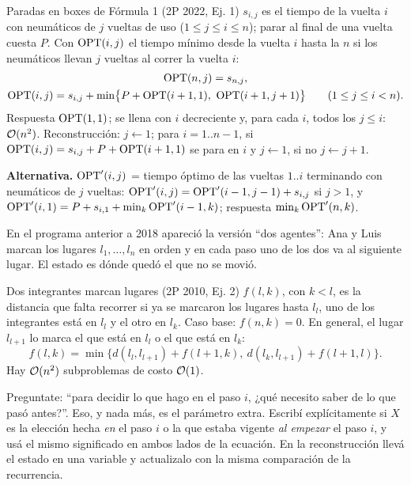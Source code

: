 \begin{problema}{Paradas en boxes de Fórmula 1 (2P 2022, Ej. 1)}
$s_{i,j}$ es el tiempo de la vuelta $i$ con neumáticos de $j$ vueltas de uso
($1\le j\le i\le n$); parar al final de una vuelta cuesta $P$. Con
$\mathrm{OPT}(i,j)$ el tiempo mínimo desde la vuelta $i$ hasta la $n$ si los
neumáticos llevan $j$ vueltas al correr la vuelta $i$:
\begin{gather*}
\OPT(n,j)=s_{n,j},\\
\OPT(i,j)=s_{i,j}+\min\bigl\{P+\OPT(i+1,1),\ \OPT(i+1,j+1)\bigr\}\qquad(1\le j\le i<n).
\end{gather*}
Respuesta $\mathrm{OPT}(1,1)$; se llena con $i$ decreciente y, para cada $i$, todos
los $j\le i$: $\mathcal{O}(n^2)$. Reconstrucción: $j\gets1$; para $i=1..n-1$, si
$\mathrm{OPT}(i,j)=s_{i,j}+P+\mathrm{OPT}(i+1,1)$ se para en $i$ y $j\gets1$, si no
$j\gets j+1$.

\textbf{Alternativa.} $\mathrm{OPT}'(i,j)$ = tiempo óptimo de las vueltas $1..i$
terminando con neumáticos de $j$ vueltas: $\mathrm{OPT}'(i,j)=\mathrm{OPT}'(i-1,j-1)+s_{i,j}$
si $j>1$, y $\mathrm{OPT}'(i,1)=P+s_{i,1}+\min_k\mathrm{OPT}'(i-1,k)$; respuesta
$\min_k\mathrm{OPT}'(n,k)$.
\end{problema}

En el programa anterior a 2018 apareció la versión ``dos agentes'': Ana y
Luis marcan los lugares $l_1,\dots,l_n$ en orden y en cada paso uno de los
dos va al siguiente lugar. El estado es dónde quedó el que no se movió.

\begin{problema}{Dos integrantes marcan lugares (2P 2010, Ej. 2)}
$f(l,k)$, con $k<l$, es la distancia que falta recorrer si ya se marcaron
los lugares hasta $l_l$, uno de los integrantes está en $l_l$ y el otro en
$l_k$. Caso base: $f(n,k)=0$. En general, el lugar $l_{l+1}$ lo marca el que
está en $l_l$ o el que está en $l_k$:
\[
f(l,k)=\min\bigl\{d(l_l,l_{l+1})+f(l+1,k),\ d(l_k,l_{l+1})+f(l+1,l)\bigr\}.
\]
Hay $\mathcal{O}(n^2)$ subproblemas de costo $\mathcal{O}(1)$.
\end{problema}

\begin{receta}
Preguntate: ``para decidir lo que hago en el paso $i$, ¿qué necesito saber
de lo que pasó antes?''. Eso, y nada más, es el parámetro extra. Escribí
explícitamente si $X$ es la elección hecha \emph{en} el paso $i$ o la que
estaba vigente \emph{al empezar} el paso $i$, y usá el mismo significado en
ambos lados de la ecuación. En la reconstrucción llevá el estado en una
variable y actualizalo con la misma comparación de la recurrencia.
\end{receta}

